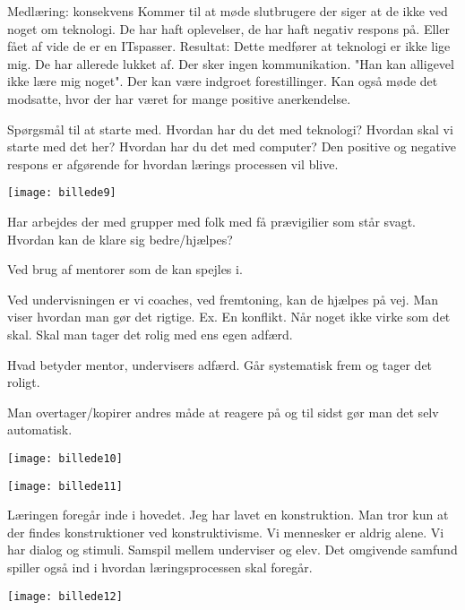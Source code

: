\documentclass[12pt, letterpaper]{article}
\begin{document}
Medlæring: konsekvens
Kommer til at møde slutbrugere der siger at de ikke ved noget om teknologi. De har haft oplevelser, de har haft negativ respons på. Eller fået af vide de er en ITspasser. Resultat: Dette medfører at teknologi er ikke lige mig. De har allerede lukket af. Der sker ingen kommunikation. "Han kan alligevel ikke lære mig noget". Der kan være indgroet forestillinger. Kan også møde det modsatte, hvor der har været for mange positive anerkendelse. 

Spørgsmål til at starte med.
Hvordan har du det med teknologi? Hvordan skal vi starte med det her? Hvordan har du det med computer?
Den positive og negative respons er afgørende for hvordan lærings processen vil blive.


\begin{center}
\texttt{[image: billede9]}
\end{center}

Har arbejdes der med grupper med folk med få prævigilier som står svagt. Hvordan kan de klare sig bedre/hjælpes?

Ved brug af mentorer som de kan spejles i.

Ved undervisningen er vi coaches, ved fremtoning, kan de hjælpes på vej. Man viser hvordan man gør det rigtige. Ex. En konflikt. Når noget ikke virke som det skal. Skal man tager det rolig med ens egen adfærd.

Hvad betyder mentor, undervisers adfærd. Går systematisk frem og tager det roligt.

Man overtager/kopirer andres måde at reagere på og til sidst gør man det selv automatisk.

\begin{center}
\texttt{[image: billede10]}
\end{center}

\begin{center}
\texttt{[image: billede11]}
\end{center}


Læringen foregår inde i hovedet. Jeg har lavet en konstruktion. Man tror kun at der findes konstruktioner ved konstruktivisme. 
Vi mennesker er aldrig alene. Vi har dialog og stimuli. 
Samspil mellem underviser og elev. Det omgivende samfund spiller også ind i hvordan læringsprocessen skal foregår. 

\begin{center}
\texttt{[image: billede12]}
\end{center}
\end{document}
